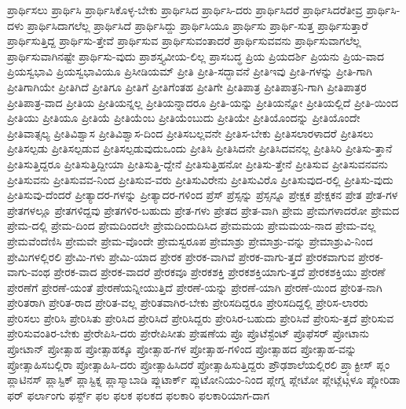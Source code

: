 {ಪ್ರಾರ್ಥಿಸಲು
ಪ್ರಾರ್ಥಿಸಿ
ಪ್ರಾರ್ಥಿಸಿಕೊಳ್ಳ-ಬೇಕು
ಪ್ರಾರ್ಥಿಸಿದ
ಪ್ರಾರ್ಥಿಸಿ-ದರು
ಪ್ರಾರ್ಥಿಸಿದರೆ
ಪ್ರಾರ್ಥಿಸಿದರೆತೀವ್ರ
ಪ್ರಾರ್ಥಿಸಿ-ದಳು
ಪ್ರಾರ್ಥಿಸಿದಾಗಲೆಲ್ಲ
ಪ್ರಾರ್ಥಿಸಿದೆ
ಪ್ರಾರ್ಥಿಸಿದ್ದು
ಪ್ರಾರ್ಥಿಸಿಯೂ
ಪ್ರಾರ್ಥಿಸು
ಪ್ರಾರ್ಥಿ-ಸುತ್ತ
ಪ್ರಾರ್ಥಿಸುತ್ತಾರೆ
ಪ್ರಾರ್ಥಿಸುತ್ತಿದ್ದ
ಪ್ರಾರ್ಥಿಸು-ತ್ತೇವೆ
ಪ್ರಾರ್ಥಿಸುವ
ಪ್ರಾರ್ಥಿಸುವಂತಾದರೆ
ಪ್ರಾರ್ಥಿಸುವವನು
ಪ್ರಾರ್ಥಿಸುವಾಗಲೆಲ್ಲ
ಪ್ರಾರ್ಥಿಸುವಾಗಿನಷ್ಟೇ
ಪ್ರಾರ್ಥಿಸು-ವುದು
ಪ್ರಾಶಸ್ತ್ಯವೀಯ-ಲಿಲ್ಲ
ಪ್ರಾಸಬದ್ಧ
ಪ್ರಿಯ
ಪ್ರಿಯದರ್ಶಿ
ಪ್ರಿಯನು
ಪ್ರಿಯ-ವಾದ
ಪ್ರಿಯಸ್ವಭಾವಿ
ಪ್ರಿಯಸ್ವಭಾವಿಯೂ
ಪ್ರಿಸೀಡಿಯಮ್
ಪ್ರೀತಿ
ಪ್ರೀತಿ-ಸದ್ಭಾವನೆ
ಪ್ರೀತಿಇವು
ಪ್ರೀತಿ-ಗಳನ್ನು
ಪ್ರೀತಿ-ಗಾಗಿ
ಪ್ರೀತಿಗಾಗಿಯೇ
ಪ್ರೀತಿಗಿದೆ
ಪ್ರೀತಿಗೂ
ಪ್ರೀತಿಗೆ
ಪ್ರೀತಿಗೆಂತಹ
ಪ್ರೀತಿಗೇ
ಪ್ರೀತಿಪಾತ್ರ
ಪ್ರೀತಿಪಾತ್ರನಿ-ಗಾಗಿ
ಪ್ರೀತಿಪಾತ್ರರ
ಪ್ರೀತಿಪಾತ್ರ-ವಾದ
ಪ್ರೀತಿಯ
ಪ್ರೀತಿಯನ್ನಲ್ಲ
ಪ್ರೀತಿಯನ್ನಾದರೂ
ಪ್ರೀತಿ-ಯನ್ನು
ಪ್ರೀತಿಯನ್ನೋ
ಪ್ರೀತಿಯಲ್ಲಿದೆ
ಪ್ರೀತಿ-ಯಿಂದ
ಪ್ರೀತಿಯು
ಪ್ರೀತಿಯೂ
ಪ್ರೀತಿಯೆ
ಪ್ರೀತಿಯೆಂಬ
ಪ್ರೀತಿಯೆಂಬುದು
ಪ್ರೀತಿಯೇ
ಪ್ರೀತಿಯೊಂದನ್ನು
ಪ್ರೀತಿಯೊಂದೇ
ಪ್ರೀತಿವಾತ್ಸಲ್ಯ
ಪ್ರೀತಿವಿಶ್ವಾಸ
ಪ್ರೀತಿವಿಶ್ವಾಸ-ದಿಂದ
ಪ್ರೀತಿಸಬಲ್ಲವನೇ
ಪ್ರೀತಿಸ-ಬೇಕು
ಪ್ರೀತಿಸಲಾರಳಾದರೆ
ಪ್ರೀತಿಸಲು
ಪ್ರೀತಿಸಲ್ಪಡು
ಪ್ರೀತಿಸಲ್ಪಡುವ
ಪ್ರೀತಿಸಲ್ಪಡುವುದುಒಂದು
ಪ್ರೀತಿಸಿ
ಪ್ರೀತಿಸಿದನೇ
ಪ್ರೀತಿಸಿದವನಲ್ಲ
ಪ್ರೀತಿಸಿರಿ
ಪ್ರೀತಿಸು-ತ್ತಾನೆ
ಪ್ರೀತಿಸುತ್ತಿದ್ದರೂ
ಪ್ರೀತಿಸುತ್ತಿದ್ದೀಯಾ
ಪ್ರೀತಿಸುತ್ತಿ-ದ್ದೇನೆ
ಪ್ರೀತಿಸುತ್ತಿಹನೋ
ಪ್ರೀತಿಸು-ತ್ತೇನೆ
ಪ್ರೀತಿಸುವ
ಪ್ರೀತಿಸುವನವನು
ಪ್ರೀತಿಸುವನು
ಪ್ರೀತಿಸುವವ-ನಿಂದ
ಪ್ರೀತಿಸುವ-ವರು
ಪ್ರೀತಿಸುವಿರೇನು
ಪ್ರೀತಿಸುವಿರೊ
ಪ್ರೀತಿಸುವುದ-ರಲ್ಲಿ
ಪ್ರೀತಿಸು-ವುದು
ಪ್ರೀತಿಸುವು-ದೆಂದರೆ
ಪ್ರೀತ್ಯಾದರ-ಗಳನ್ನು
ಪ್ರೀತ್ಯಾದರ-ಗಳಿಂದ
ಪ್ರೆಸ್
ಪ್ರೆಸ್ಸನ್ನು
ಪ್ರೆಸ್ಸನ್ನೂ
ಪ್ರೇಕ್ಷಕ
ಪ್ರೇಕ್ಷಕನ
ಪ್ರೇತ
ಪ್ರೇತ-ಗಳ
ಪ್ರೇತಗಳಲ್ಲೂ
ಪ್ರೇತಗಳಿದ್ದವು
ಪ್ರೇತಗಳಿರ-ಬಹುದು
ಪ್ರೇತ-ಗಳು
ಪ್ರೇತದ
ಪ್ರೇತ-ವಾಗಿ
ಪ್ರೇಮ
ಪ್ರೇಮಗಳಾದರೋ
ಪ್ರೇಮದ
ಪ್ರೇಮ-ದಲ್ಲಿ
ಪ್ರೇಮ-ದಿಂದ
ಪ್ರೇಮದಿಂದಲೇ
ಪ್ರೇಮದಿಂದುದಿಸಿದ
ಪ್ರೇಮಮಯ
ಪ್ರೇಮಮಯ-ನಾದ
ಪ್ರೇಮ-ವಲ್ಲ
ಪ್ರೇಮವೆಂದೆಣಿಸಿ
ಪ್ರೇಮವೇ
ಪ್ರೇಮ-ವೊಂದೇ
ಪ್ರೇಮಸ್ವರೂಪ
ಪ್ರೇಮಾಶ್ರು
ಪ್ರೇಮಾಶ್ರು-ವನ್ನು
ಪ್ರೇಮಾಶ್ರುವಿ-ನಿಂದ
ಪ್ರೇಮಿಗಳಲ್ಲಿರಲಿ
ಪ್ರೇಮಿ-ಗಳು
ಪ್ರೇಮಿ-ಯಾದ
ಪ್ರೇರಕ
ಪ್ರೇರಕ-ವಾಗಿವೆ
ಪ್ರೇರಕ-ವಾಗು-ತ್ತದೆ
ಪ್ರೇರಕವಾಗುವ
ಪ್ರೇರಕ-ವಾಗು-ವಂಥ
ಪ್ರೇರಕ-ವಾದ
ಪ್ರೇರಕ-ವಾದರೆ
ಪ್ರೇರಕವೂ
ಪ್ರೇರಕಶಕ್ತಿ
ಪ್ರೇರಕಶಕ್ತಿಯಾಗು-ತ್ತದೆ
ಪ್ರೇರಕಶಕ್ತಿಯು
ಪ್ರೇರಣೆ
ಪ್ರೇರಣೆಗೆ
ಪ್ರೇರಣೆ-ಯಂತೆ
ಪ್ರೇರಣೆಯನ್ನೀಯುತ್ತಿದೆ
ಪ್ರೇರಣೆ-ಯನ್ನು
ಪ್ರೇರಣೆ-ಯಾಗಿ
ಪ್ರೇರಣೆ-ಯಿಂದ
ಪ್ರೇರಿತ-ನಾಗಿ
ಪ್ರೇರಿತರಾಗಿ
ಪ್ರೇರಿತ-ರಾದ
ಪ್ರೇರಿತ-ವಲ್ಲ
ಪ್ರೇರಿತವಾಗಿರ-ಬೇಕು
ಪ್ರೇರಿಸದಿದ್ದರೂ
ಪ್ರೇರಿಸದಿದ್ದಲ್ಲಿ
ಪ್ರೇರಿಸ-ಲಾರರು
ಪ್ರೇರಿಸಲು
ಪ್ರೇರಿಸಿ
ಪ್ರೇರಿಸಿತು
ಪ್ರೇರಿಸಿದ
ಪ್ರೇರಿಸಿದೆ
ಪ್ರೇರಿಸಿದ್ದರು
ಪ್ರೇರಿಸಿರ-ಬಹುದು
ಪ್ರೇರಿಸಿವೆ
ಪ್ರೇರಿಸು-ತ್ತದೆ
ಪ್ರೇರಿಸುವ
ಪ್ರೇರಿಸುವಂತಿರ-ಬೇಕು
ಪ್ರೇರೇಪಿಸಿ-ದರು
ಪ್ರೇರೇಪಿಸೀತು
ಪ್ರೇಷಣೆಯ
ಪ್ರೊ
ಪ್ರೊಟೆಸ್ಟೆಂಟ್
ಪ್ರೊಫೆಸರ್
ಪ್ರೋಟಾನು
ಪ್ರೋಟಾನ್
ಪ್ರೋತ್ಸಾಹ
ಪ್ರೋತ್ಸಾಹಕ್ಕೂ
ಪ್ರೋತ್ಸಾಹ-ಗಳ
ಪ್ರೋತ್ಸಾಹ-ಗಳಿಂದ
ಪ್ರೋತ್ಸಾಹದ
ಪ್ರೋತ್ಸಾಹ-ವನ್ನು
ಪ್ರೋತ್ಸಾಹಿಸಬಲ್ಲಿರಾ
ಪ್ರೋತ್ಸಾಹಿಸಿ-ದರು
ಪ್ರೋತ್ಸಾಹಿಸಿದರೆ
ಪ್ರೋತ್ಸಾಹಿಸುತ್ತಿದ್ದರು
ಪ್ರೌಢಶಾಲೆಯಲ್ಲಿರಲಿ
ಪ್ರ್ಯಾಕ್ಟೀಸ್
ಪ್ಲಂ
ಪ್ಲಾಟಿನಸ್
ಪ್ಲಾಸ್ಟಿಕ್
ಪ್ಲಾಸ್ಟಿಕ್ನ
ಪ್ಲಾಸ್ಮಾಬಾಡಿ
ಪ್ಲುಟಾರ್ಕ್
ಪ್ಲುಟೋನಿಯಂ-ನಿಂದ
ಪ್ಲೇಗ್ನ
ಪ್ಲೇಟೋ
ಪ್ಲೇಟ್ಲೆಟ್ಗಳೂ
ಪ್ಲೋರಿಡಾ
ಫರ್
ಫರ್ಲಾಂಗು
ಫರ್ಸ್ಟ್
ಫಲ
ಫಲಕ
ಫಲಕದ
ಫಲಕಾರಿ
ಫಲಕಾರಿಯಾಗ-ದಾಗ
}
